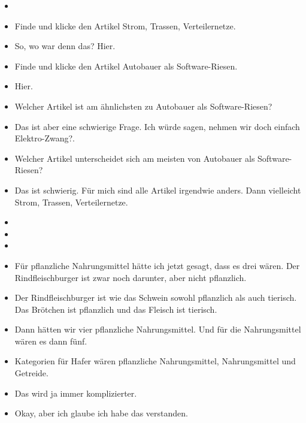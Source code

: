 {\begin{itemize}[]
                  Die spielen im Thema E-Mobilität auch eine große Rolle, würde ich jetzt mal so behaupten.
            \item {}
            \item {} Finde und klicke den Artikel \flqq Strom, Trassen, Verteilernetze\frqq{}.
            \item {} So, wo war denn das? Hier.
            \item {} Finde und klicke den Artikel \flqq Autobauer als Software-Riesen\frqq{}.
            \item {} Hier.
            \item {} Welcher Artikel ist am ähnlichsten zu \flqq Autobauer als Software-Riesen\frqq{}?
            \item {} Das ist aber eine schwierige Frage. Ich würde sagen, nehmen wir doch einfach \flqq Elektro-Zwang?\frqq{}.
            \item {} Welcher Artikel unterscheidet sich am meisten von \flqq Autobauer als Software-Riesen\frqq{}?
            \item {} Das ist schwierig. Für mich sind alle Artikel irgendwie anders. Dann vielleicht \flqq Strom, Trassen, Verteilernetze\frqq{}.
            \item {}
            \item {}
            \item {}
            \item {} Für pflanzliche Nahrungsmittel hätte ich jetzt gesagt, dass es drei wären.
                  Der Rindfleischburger ist zwar noch darunter, aber nicht pflanzlich.
            \item {} Der Rindfleischburger ist wie das Schwein sowohl pflanzlich als auch tierisch. Das Brötchen ist pflanzlich und das Fleisch ist tierisch.
            \item {} Dann hätten wir vier pflanzliche Nahrungsmittel. Und für die Nahrungsmittel wären es dann fünf.
            \item {} Kategorien für Hafer wären pflanzliche Nahrungsmittel, Nahrungsmittel und Getreide.
            \item {} Das wird ja immer komplizierter.
            \item {} Okay, aber ich glaube ich habe das verstanden.

\end{itemize}}
